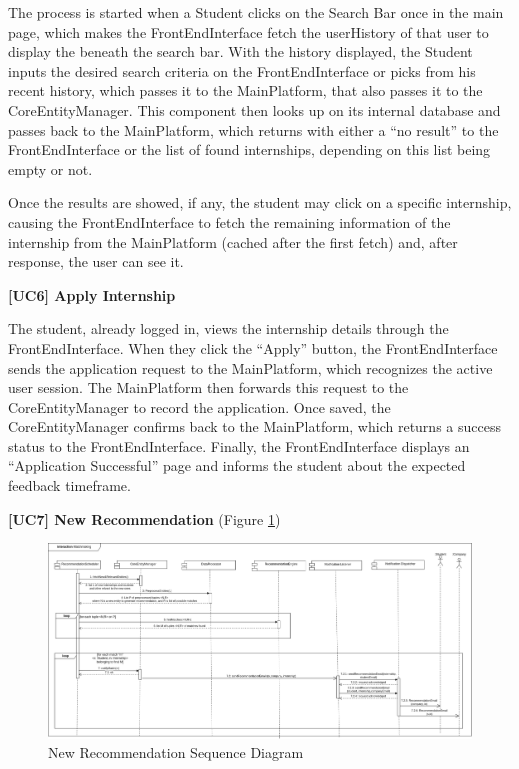 The process is started when a Student clicks on the Search Bar once in the main page, which makes the FrontEndInterface fetch the userHistory of that user to display the beneath the search bar. With the history displayed, the Student inputs the desired search criteria on the FrontEndInterface or picks from his recent history, which passes it to the MainPlatform, that also passes it to the CoreEntityManager. This component then looks up on its internal database and passes back to the MainPlatform, which returns with either a ``no result'' to the FrontEndInterface or the list of found internships, depending on this list being empty or not.

Once the results are showed, if any, the student may click on a specific internship, causing the FrontEndInterface to fetch the remaining information of the internship from the MainPlatform (cached after the first fetch) and, after response, the user can see it.

\textbf{[UC6] Apply Internship}

The student, already logged in, views the internship details through the FrontEndInterface. When they click the ``Apply'' button, the FrontEndInterface sends the application request to the MainPlatform, which recognizes the active user session. The MainPlatform then forwards this request to the CoreEntityManager to record the application. Once saved, the CoreEntityManager confirms back to the MainPlatform, which returns a success status to the FrontEndInterface. Finally, the FrontEndInterface displays an ``Application Successful'' page and informs the student about the expected feedback timeframe.


\textbf{[UC7] New Recommendation} (Figure \ref{fig:matchmakingseq})


\begin{figure}[H]
\centering
\includegraphics[width=\textwidth]{Images/matchmaking-process-sequence.png}
\caption{\label{fig:matchmakingseq} New Recommendation Sequence Diagram}
\end{figure}

